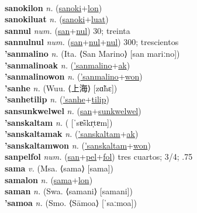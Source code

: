  \label{sanokiles} \\
\textbf{sanokilon} \textit{n.} (\hyperref[sanoki]{sanoki}+\hyperref[lon]{lon})
 \label{sanokilon} \\
\textbf{sanokiluat} \textit{n.} (\hyperref[sanoki]{sanoki}+\hyperref[luat]{luat})
 \label{sanokiluat} \\
\textbf{sannul} \textit{num.} (\hyperref[san]{san}+\hyperref[nul]{nul})
30; treinta \label{sannul} \\
\textbf{sannulnul} \textit{num.} (\hyperref[san]{san}+\hyperref[nul]{nul}+\hyperref[nul]{nul})
300; trescientos \label{sannulnul} \\
\textbf{'sanmalino} \textit{n.} (Ita. ⟨San Marino⟩ [san mariːno])
 \label{'sanmalino} \\
\textbf{'sanmalinoak} \textit{n.} (\hyperref['sanmalino]{'sanmalino}+\hyperref[ak]{ak})
 \label{'sanmalinoak} \\
\textbf{'sanmalinowon} \textit{n.} (\hyperref['sanmalino]{'sanmalino}+\hyperref[won]{won})
 \label{'sanmalinowon} \\
\textbf{'sanhe} \textit{n.} (Wuu. ⟨上海⟩ [zɑ̃hɛ])
 \label{'sanhe} \\
\textbf{'sanhetilip} \textit{n.} (\hyperref['sanhe]{'sanhe}+\hyperref[tilip]{tilip})
 \label{'sanhetilip} \\
\textbf{sansunkwelwel} \textit{n.} (\hyperref[san]{san}+\hyperref[sunkwelwel]{sunkwelwel})
 \label{sansunkwelwel} \\
\textbf{'sanskaltam} \textit{n.} ( [ˈsɐ̃skr̩tɐm])
 \label{'sanskaltam} \\
\textbf{'sanskaltamak} \textit{n.} (\hyperref['sanskaltam]{'sanskaltam}+\hyperref[ak]{ak})
 \label{'sanskaltamak} \\
\textbf{'sanskaltamwon} \textit{n.} (\hyperref['sanskaltam]{'sanskaltam}+\hyperref[won]{won})
 \label{'sanskaltamwon} \\
\textbf{sanpelfol} \textit{num.} (\hyperref[san]{san}+\hyperref[pel]{pel}+\hyperref[fol]{fol})
tres cuartos; 3/4; .75 \label{sanpelfol} \\
\textbf{sama} \textit{v.} (Msa. ⟨sama⟩ [sama])
 \label{sama} \\
\textbf{samalon} \textit{n.} (\hyperref[sama]{sama}+\hyperref[lon]{lon})
 \label{samalon} \\
\textbf{saman} \textit{n.} (Swa. ⟨samani⟩ [samani])
 \label{saman} \\
\textbf{'samoa} \textit{n.} (Smo. ⟨Sāmoa⟩ [ˈsaːmoa])
 \label{'samoa} \\

